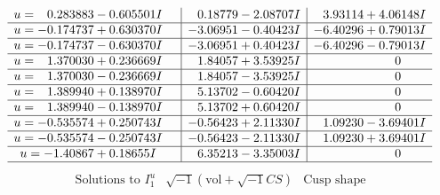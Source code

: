 \documentclass[1p]{elsarticle_modified}
\theoremstyle{definition}
\newcommand{\I}{\sqrt{-1}}
\begin{document}
$$\begin{array}{c|c|c}
\begin{aligned}
u &= \phantom{-}0.283883 - 0.605501 I\end{aligned}
 & \phantom{-}0.18779 - 2.08707 I & \phantom{-}3.93114 + 4.06148 I \\ \hline\begin{aligned}
u &= -0.174737 + 0.630370 I\end{aligned}
 & -3.06951 - 0.40423 I & -6.40296 + 0.79013 I \\ \hline\begin{aligned}
u &= -0.174737 - 0.630370 I\end{aligned}
 & -3.06951 + 0.40423 I & -6.40296 - 0.79013 I \\ \hline\begin{aligned}
u &= \phantom{-}1.370030 + 0.236669 I\end{aligned}
 & \phantom{-}1.84057 + 3.53925 I & \phantom{-0.000000 } 0 \\ \hline\begin{aligned}
u &= \phantom{-}1.370030 - 0.236669 I\end{aligned}
 & \phantom{-}1.84057 - 3.53925 I & \phantom{-0.000000 } 0 \\ \hline\begin{aligned}
u &= \phantom{-}1.389940 + 0.138970 I\end{aligned}
 & \phantom{-}5.13702 - 0.60420 I & \phantom{-0.000000 } 0 \\ \hline\begin{aligned}
u &= \phantom{-}1.389940 - 0.138970 I\end{aligned}
 & \phantom{-}5.13702 + 0.60420 I & \phantom{-0.000000 } 0 \\ \hline\begin{aligned}
u &= -0.535574 + 0.250743 I\end{aligned}
 & -0.56423 + 2.11330 I & \phantom{-}1.09230 - 3.69401 I \\ \hline\begin{aligned}
u &= -0.535574 - 0.250743 I\end{aligned}
 & -0.56423 - 2.11330 I & \phantom{-}1.09230 + 3.69401 I \\ \hline\begin{aligned}
u &= -1.40867 + 0.18655 I\end{aligned}
 & \phantom{-}6.35213 - 3.35003 I & \phantom{-0.000000 } 0\\
 \hline 
 \end{array}$$\newpage$$\begin{array}{c|c|c}  
\text{Solutions to }I^u_{1}& \I (\text{vol} + \sqrt{-1}CS) & \text{Cusp shape}\\

\end{array}$$
\end{document}
